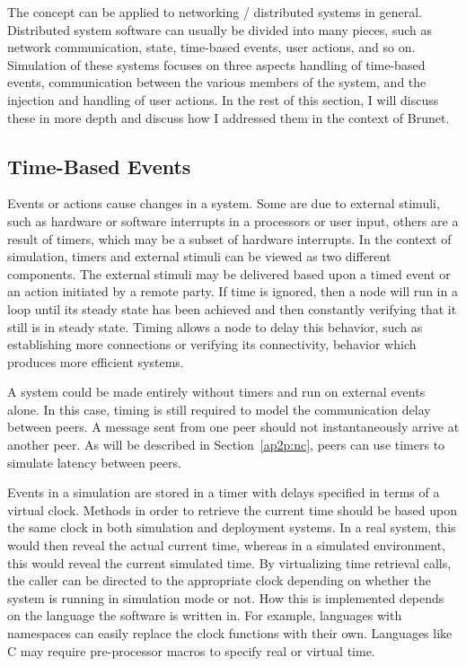 The concept can be applied to networking / distributed systems in general.
Distributed system software can usually be divided into many pieces, such as
network communication, state, time-based events, user actions, and so on.
Simulation of these systems focuses on three aspects handling of time-based
events, communication between the various members of the system, and the
injection and handling of user actions.  In the rest of this section, I will
discuss these in more depth and discuss how I addressed them in the context of
Brunet.

\subsection{Time-Based Events}

Events or actions cause changes in a system.  Some are due to external stimuli,
such as hardware or software interrupts in a processors or user input, others
are a result of timers, which may be a subset of hardware interrupts.  In the
context of simulation, timers and external stimuli can be viewed as two
different components.  The external stimuli may be delivered based upon a timed
event or an action initiated by a remote party.  If time is ignored, then a
node will run in a loop until its steady state has been achieved and then
constantly verifying that it still is in steady state.  Timing allows a node to
delay this behavior, such as establishing more connections or verifying its
connectivity, behavior which produces more efficient systems.

A system could be made entirely without timers and run on external events
alone.  In this case, timing is still required to model the communication delay
between peers.  A message sent from one peer should not instantaneously arrive
at another peer.  As will be described in Section~\ref{ap2p:nc}, peers can use
timers to simulate latency between peers.

Events in a simulation are stored in a timer with delays specified in terms of
a virtual clock.  Methods in order to retrieve the current time should be based
upon the same clock in both simulation and deployment systems.  In a real
system, this would then reveal the actual current time, whereas in a simulated
environment, this would reveal the current simulated time.  By virtualizing
time retrieval calls, the caller can be directed to the appropriate clock
depending on whether the system is running in simulation mode or not.  How this
is implemented depends on the language the software is written in.  For
example, languages with namespaces can easily replace the clock functions with
their own.  Languages like C may require pre-processor macros to specify real
or virtual time.


